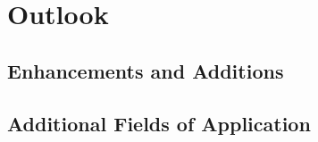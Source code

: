 
\chapter{Outlook}

\section{Enhancements and Additions}

\section{Additional Fields of Application}

